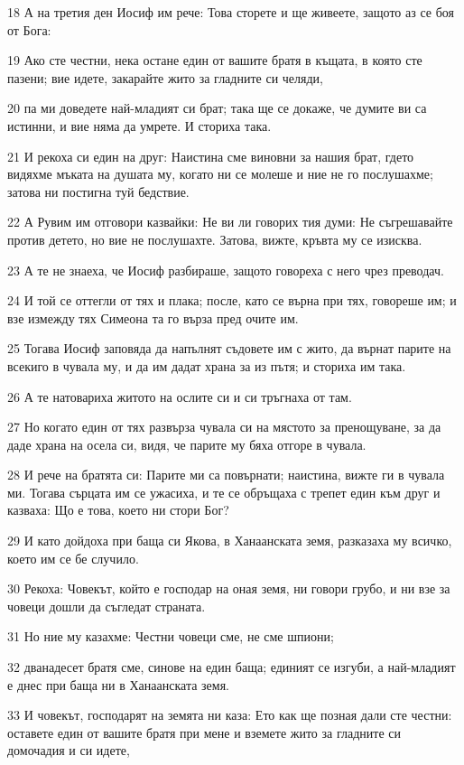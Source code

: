 \par 18 А на третия ден Иосиф им рече: Това сторете и ще живеете, защото аз се боя от Бога:
\par 19 Ако сте честни, нека остане един от вашите братя в къщата, в която сте пазени; вие идете, закарайте жито за гладните си челяди,
\par 20 па ми доведете най-младият си брат; така ще се докаже, че думите ви са истинни, и вие няма да умрете. И сториха така.
\par 21 И рекоха си един на друг: Наистина сме виновни за нашия брат, гдето видяхме мъката на душата му, когато ни се молеше и ние не го послушахме; затова ни постигна туй бедствие.
\par 22 А Рувим им отговори казвайки: Не ви ли говорих тия думи: Не съгрешавайте против детето, но вие не послушахте. Затова, вижте, кръвта му се изисква.
\par 23 А те не знаеха, че Иосиф разбираше, защото говореха с него чрез преводач.
\par 24 И той се оттегли от тях и плака; после, като се върна при тях, говореше им; и взе измежду тях Симеона та го върза пред очите им.
\par 25 Тогава Иосиф заповяда да напълнят съдовете им с жито, да върнат парите на всекиго в чувала му, и да им дадат храна за из пътя; и сториха им така.
\par 26 А те натовариха житото на ослите си и си тръгнаха от там.
\par 27 Но когато един от тях развърза чувала си на мястото за пренощуване, за да даде храна на осела си, видя, че парите му бяха отгоре в чувала.
\par 28 И рече на братята си: Парите ми са повърнати; наистина, вижте ги в чувала ми. Тогава сърцата им се ужасиха, и те се обръщаха с трепет един към друг и казваха: Що е това, което ни стори Бог?
\par 29 И като дойдоха при баща си Якова, в Ханаанската земя, разказаха му всичко, което им се бе случило.
\par 30 Рекоха: Човекът, който е господар на оная земя, ни говори грубо, и ни взе за човеци дошли да съгледат страната.
\par 31 Но ние му казахме: Честни човеци сме, не сме шпиони;
\par 32 дванадесет братя сме, синове на един баща; единият се изгуби, а най-младият е днес при баща ни в Ханаанската земя.
\par 33 И човекът, господарят на земята ни каза: Ето как ще позная дали сте честни: оставете един от вашите братя при мене и вземете жито за гладните си домочадия и си идете,
